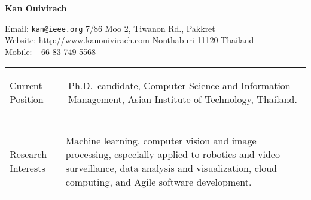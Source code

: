 \documentclass[11pt]{article}
\makeatletter
\newcommand{\mysection}[2]{
   \noindent
   \begin{tabular}{@{}ll@{}}
   \parbox[t]{1.0in}{ \raggedright \bf #1 } &
   \parbox[t]{5.0in}{ #2 }\\
   \hspace{0.2in}
   \end{tabular}
}
\makeatother
\begin{document}
 
\pagestyle{empty}
\thispagestyle{empty}

\begin{center}
{\LARGE \bf \noindent Kan Ouivirach}
\end{center}

\vspace{0.1in}
\TPMargin{4pt}
\setlength{\TPHorizModule}{10pt}
\setlength{\TPVertModule}{10pt}


\noindent
Email: {\tt kan@ieee.org} \hfill 7/86 Moo 2, Tiwanon Rd., Pakkret\\
Website: \url{http://www.kanouivirach.com} \hfill Nonthaburi 11120 Thailand\\
Mobile: +66 83 749 5568 %

\noindent \hrulefill

\vspace{0.2in}

\mysection{

  Current Position}{Ph.D.\ candidate, Computer Science and Information
  Management, Asian Institute of Technology, Thailand.

}


\mysection{ 

  Research Interests}{Machine learning, computer vision and image
  processing, especially applied to robotics and video surveillance,
  data analysis and visualization, cloud computing, and Agile software
  development.

}

\vspace{0.1in}
\end{document}
